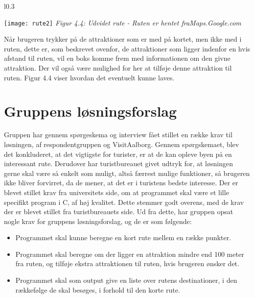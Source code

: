 \begin{wrapfigure}{l}{0.3\textwidth}
	\vspace{-60pt}
	\begin{center}
		\texttt{[image: rute2]} \newline
		\textit{Figur 4.4: Udvidet rute - Ruten er hentet fra\newline Maps.Google.com}\newline
	\end{center}
	\vspace{-20pt}
	\vspace{-10pt}
\end{wrapfigure}

Når brugeren trykker på de attraktioner som er med på kortet, men ikke med i ruten, dette er, som beskrevet ovenfor, de attraktioner som ligger indenfor en hvis afstand til ruten, vil en boks komme frem med informationen om den givne attraktion. Der vil også være mulighed for her at tilføje denne attraktion til ruten. Figur 4.4 viser hvordan det eventuelt kunne laves. \newline
\newline
\newline
\newline
\newline
\newline
\newline
\newline
\newline
\newline
\newline


\section{Gruppens løsningsforslag}
Gruppen har gennem spørgeskema og interview fået stillet en række krav til løsningen, af respondentgruppen og VisitAalborg. 
Gennem spørgskemaet, blev det konkluderet, at det vigtigste for turister, er at de kan opleve byen på en interessant rute. 
Derudover har turistbureauet givet udtryk for, at løsningen gerne skal være så enkelt som muligt, altså færrest mulige funktioner, så brugeren ikke bliver forvirret, da de mener, at det er i turistens bedste interesse. \newline
Der er blevet stillet krav fra universitets side, om at programmet skal være et lille specifikt program i C, af høj kvalitet. Dette stemmer godt overens, med de krav der er blevet stillet fra turistbureauets side.   \newline
Ud fra dette, har gruppen opsat nogle krav for gruppens løsningsforslag, og de er som følgende:
\begin{itemize}
	\item Programmet skal kunne beregne en kort rute mellem en række punkter.
	\item Programmet skal beregne om der ligger en attraktion mindre end 100 meter fra ruten, og tilføje ekstra attraktionen til ruten, hvis brugeren ønsker det.
	\item Programmet skal som output give en liste over rutens destinationer, i den rækkefølge de skal besøges, i forhold til den korte rute.
\end{itemize}

